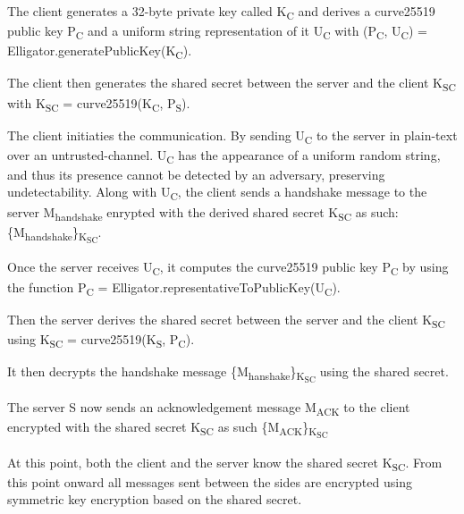 \documentclass[11pt]{book} %
\begin{document}
The client generates a 32-byte private key called K\textsubscript{C} and derives a curve25519 public key P\textsubscript{C} and a uniform string representation of it U\textsubscript{C} with (P\textsubscript{C}, U\textsubscript{C}) = Elligator.generatePublicKey(K\textsubscript{C}).

The client then generates the shared secret between the server and the client K\textsubscript{SC} with K\textsubscript{SC} = curve25519(K\textsubscript{C},  P\textsubscript{S}).

The client initiaties the communication. By sending U\textsubscript{C} to the server in plain-text over an untrusted-channel. U\textsubscript{C} has the appearance of a uniform random string, and thus its presence cannot be detected by an adversary, preserving undetectability. Along with U\textsubscript{C}, the client sends a handshake message to the server M\textsubscript{handshake} enrypted with the derived shared secret K\textsubscript{SC} as such: \{M\textsubscript{handshake}\}\textsubscript{K\textsubscript{SC}}.

Once the server receives U\textsubscript{C}, it computes the curve25519 public key P\textsubscript{C} by using the function P\textsubscript{C} = Elligator.representativeToPublicKey(U\textsubscript{C}).

Then the server derives the shared secret between the server and the client K\textsubscript{SC} using K\textsubscript{SC} = curve25519(K\textsubscript{S}, P\textsubscript{C}).

It then decrypts the handshake message \{M\textsubscript{hanshake}\}\textsubscript{K\textsubscript{SC}} using the shared secret.

The server S now sends an acknowledgement message M\textsubscript{ACK} to the client encrypted with the shared secret K\textsubscript{SC} as such 
\{M\textsubscript{ACK}\}\textsubscript{K\textsubscript{SC}}

At this point, both the client and the server know the shared secret K\textsubscript{SC}. From this point onward all messages sent between the sides are encrypted using symmetric key encryption based on the shared secret.
\end{document}
